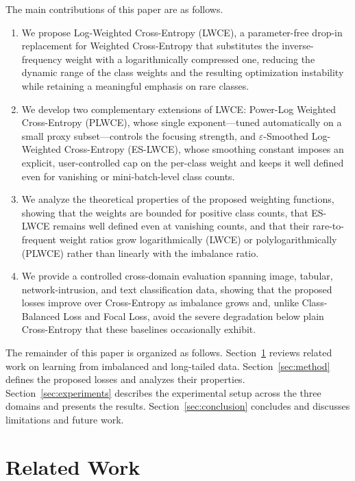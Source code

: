 \documentclass[a4paper,fleqn]{cas-sc}
\begin{document}
The main contributions of this paper are as follows.
\begin{enumerate}
  \item We propose Log-Weighted Cross-Entropy (LWCE), a parameter-free drop-in
        replacement for Weighted Cross-Entropy that substitutes the
        inverse-frequency weight with a logarithmically compressed one, reducing
        the dynamic range of the class weights and the resulting optimization
        instability while retaining a meaningful emphasis on rare classes.
  \item We develop two complementary extensions of LWCE: Power-Log Weighted
        Cross-Entropy (PLWCE), whose single exponent---tuned automatically on a
        small proxy subset---controls the focusing strength, and
        $\varepsilon$-Smoothed Log-Weighted Cross-Entropy (ES-LWCE), whose smoothing
        constant imposes an explicit, user-controlled cap on the per-class weight
        and keeps it well defined even for vanishing or mini-batch-level class
        counts.
  \item We analyze the theoretical properties of the proposed weighting functions,
        showing that the weights are bounded for positive class counts, that ES-LWCE
        remains well defined even at vanishing counts, and that their rare-to-frequent
        weight ratios grow logarithmically (LWCE) or polylogarithmically (PLWCE)
        rather than linearly with the imbalance ratio.
  \item We provide a controlled cross-domain evaluation spanning image, tabular,
        network-intrusion, and text classification data, showing that the proposed
        losses improve over Cross-Entropy as imbalance grows and, unlike
        Class-Balanced Loss and Focal Loss, avoid the severe degradation below plain
        Cross-Entropy that these baselines occasionally exhibit.
\end{enumerate}

The remainder of this paper is organized as follows.
Section~\ref{sec:related} reviews related work on learning from imbalanced and
long-tailed data. Section~\ref{sec:method} defines the proposed losses and
analyzes their properties. Section~\ref{sec:experiments} describes the
experimental setup across the three domains and presents the results.
Section~\ref{sec:conclusion} concludes and discusses limitations and future work.

\section{Related Work}\label{sec:related}
\end{document}
